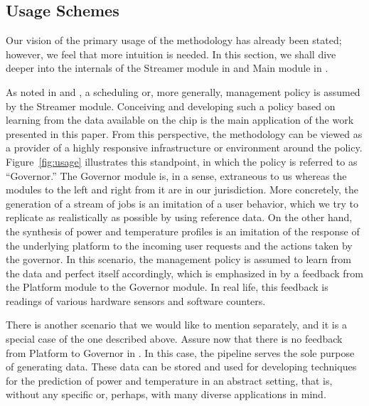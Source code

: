 \subsection{Usage Schemes} 
 Our vision of the primary usage of the
methodology has already been stated; however, we feel that more intuition is
needed. In this section, we shall dive deeper into the internals of the Streamer
module in  and Main module in .

As noted in  and , a scheduling or, more
generally, management policy is assumed by the Streamer module. Conceiving and
developing such a policy based on learning from the data available on the chip
is the main application of the work presented in this paper. From this
perspective, the methodology can be viewed as a provider of a highly responsive
infrastructure or environment around the policy. Figure~\ref{fig:usage}
illustrates this standpoint, in which the policy is referred to as ``Governor.''
The Governor module is, in a sense, extraneous to us whereas the modules to the
left and right from it are in our jurisdiction. More concretely, the generation
of a stream of jobs is an imitation of a user behavior, which we try to
replicate as realistically as possible by using reference data. On the other
hand, the synthesis of power and temperature profiles is an imitation of the
response of the underlying platform to the incoming user requests and the
actions taken by the governor. In this scenario, the management policy is
assumed to learn from the data and perfect itself accordingly, which is
emphasized in  by a feedback from the Platform module to the
Governor module. In real life, this feedback is readings of various hardware
sensors and software counters.

There is another scenario that we would like to mention separately, and it is a
special case of the one described above. Assure now that there is no feedback
from Platform to Governor in . In this case, the pipeline serves the
sole purpose of generating data. These data can be stored and used for
developing techniques for the prediction of power and temperature in an abstract
setting, that is, without any specific or, perhaps, with many diverse
applications in mind.
